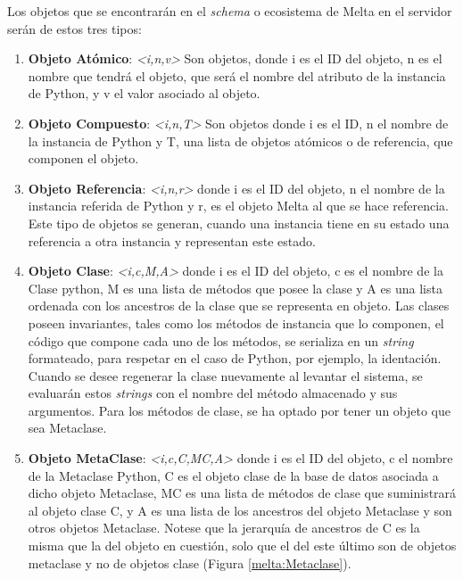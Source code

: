 \documentclass{melta}
\begin{document}
Los objetos que se encontrarán en el \textit{schema} o ecosistema de Melta en el servidor serán de estos tres tipos:
\begin{enumerate}
  \item \textbf{Objeto Atómico}: \textit{\textless i,n,v\textgreater} Son objetos, donde i es el ID del objeto, n es el nombre que tendrá el objeto, que será el nombre del atributo de la instancia de Python, y v el valor asociado al objeto. 
  \item \textbf{Objeto Compuesto}: \textit{\textless i,n,T\textgreater} Son objetos donde i es el ID, n el nombre de la instancia de Python y T, una lista de objetos atómicos o de referencia, que componen el objeto.
  \item \textbf{Objeto Referencia}: \textit{\textless i,n,r\textgreater} donde i es el ID del objeto, n el nombre de la instancia referida de Python y r, es el objeto Melta al que se hace referencia. Este tipo de objetos se generan, cuando una instancia tiene en su estado una referencia a otra instancia y representan este estado.
  \item \textbf{Objeto Clase}: \textit{\textless i,c,M,A\textgreater} donde i es el ID del objeto, c es el nombre de la Clase python, M es una lista de métodos que posee la clase y A es una lista ordenada con los ancestros de la clase que se representa en objeto. Las clases poseen invariantes, tales como los métodos de instancia que lo componen, el código que compone cada uno de los métodos, se serializa en un \textit{string} formateado, para respetar en el caso de Python, por ejemplo, la identación. Cuando se desee regenerar la clase nuevamente al levantar el sistema, se evaluarán estos \textit{strings} con el nombre del método almacenado y sus argumentos. Para los métodos de clase, se ha optado por tener un objeto que sea Metaclase.
  \item \textbf{Objeto MetaClase}:  \textit{\textless i,c,C,MC,A\textgreater} donde i es el ID del objeto, c el nombre de la Metaclase Python, C es el objeto clase de la base de datos asociada a dicho objeto Metaclase, MC es una lista de métodos de clase que suministrará al objeto clase C, y A es una lista de los ancestros del objeto Metaclase y son otros objetos Metaclase. Notese que la jerarquía de ancestros de C es la misma que la del objeto en cuestión, solo que el del este último son de objetos metaclase y no de objetos clase (Figura \ref{melta:Metaclase}).  
\end{enumerate}
\end{document}
